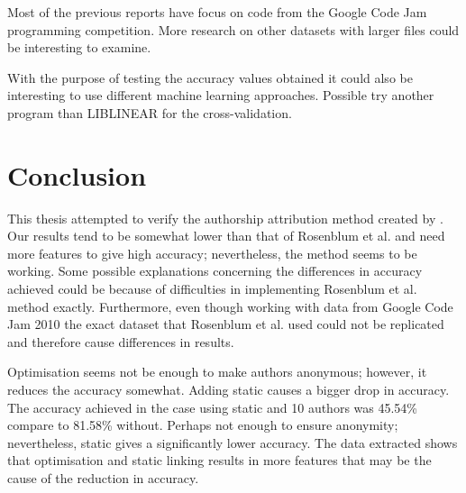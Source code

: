 \documentclass[a4paper,11pt]{kth-mag}
\begin{document}
Most of the previous reports have focus on code from the Google Code Jam
programming competition. More research on other datasets with larger files
could be interesting to examine.

With the purpose of testing the accuracy values obtained it could also be
interesting to use different machine learning approaches. Possible try another
program than LIBLINEAR for the cross-validation.

\chapter{Conclusion}
This thesis attempted to verify the authorship attribution method created by
\parencite{rosenblum2011wrote}. Our results tend to be somewhat lower than that
of Rosenblum et al. and need more features to give high accuracy; nevertheless,
the method seems to be working. Some possible explanations concerning the
differences in accuracy achieved could be because of difficulties in
implementing Rosenblum et al. method exactly. Furthermore, even though working
with data from Google Code Jam 2010 the exact dataset that Rosenblum et al.
used could not be replicated and therefore cause differences in results. 

Optimisation seems not be enough to make authors anonymous; however, it reduces
the accuracy somewhat. Adding static causes a bigger drop in accuracy. The
accuracy achieved in the case using static and 10 authors was 45.54\% compare
to 81.58\% without. Perhaps not enough to ensure anonymity; nevertheless,
static gives a significantly lower accuracy. The data extracted shows that
optimisation and static linking results in more features that may be the cause
of the reduction in accuracy.

\printbibliography
\end{document}
